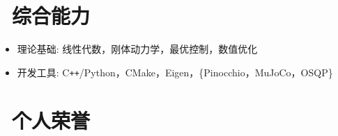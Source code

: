 \documentclass{resume}
\begin{document}
\section{\faCogs\ 综合能力}
\begin{itemize}[parsep=0.5ex]
  \item 理论基础: 线性代数，刚体动力学，最优控制，数值优化%
  \item 开发工具: C\texttt{++}/Python，CMake，Eigen，\{Pinocchio，MuJoCo，OSQP\}
\end{itemize}

\section{\faHeartO\ 个人荣誉}
\end{document}
